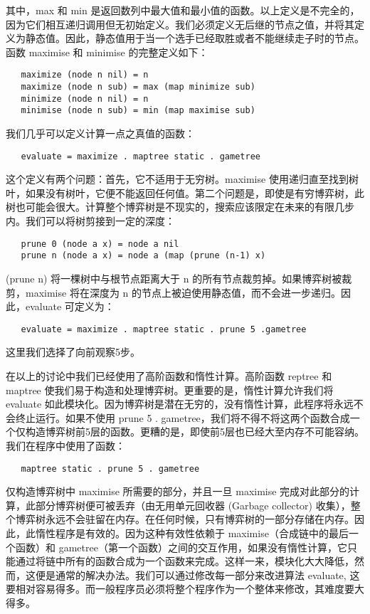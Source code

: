 \documentclass[12pt,a4paper]{article}
\begin{document}
其中，max 和 min 是返回数列中最大值和最小值的函数。以上定义是不完全的，因为它们相互递归调用但无初始定义。我们必须定义无后继的节点之值，并将其定义为静态值。因此，静态值用于当一个选手已经取胜或者不能继续走子时的节点。函数 maximise 和 minimise 的完整定义如下：

\begin{verbatim}
   maximize (node n nil) = n
   maximize (node n sub) = max (map minimize sub)
   minimize (node n nil) = n
   minimise (node n sub) = min (map maximise sub)
\end{verbatim}

我们几乎可以定义计算一点之真值的函数：

\begin{verbatim}
   evaluate = maximize . maptree static . gametree
\end{verbatim}

这个定义有两个问题：首先，它不适用于无穷树。maximise 使用递归直至找到树叶，如果没有树叶，它便不能返回任何值。第二个问题是，即使是有穷博弈树，此树也可能会很大。计算整个博弈树是不现实的，搜索应该限定在未来的有限几步内。我们可以将树剪接到一定的深度：

\begin{verbatim}
   prune 0 (node a x) = node a nil
   prune n (node a x) = node a (map (prune (n-1) x)
\end{verbatim}

(prune n) 将一棵树中与根节点距离大于 n 的所有节点裁剪掉。如果博弈树被裁剪，maximise 将在深度为 n 的节点上被迫使用静态值，而不会进一步递归。因此，evaluate 可定义为：

\begin{verbatim}
   evaluate = maximize . maptree static . prune 5 .gametree
\end{verbatim}

这里我们选择了向前观察5步。

在以上的讨论中我们已经使用了高阶函数和惰性计算。高阶函数 reptree 和 maptree 使我们易于构造和处理博弈树。更重要的是，惰性计算允许我们将 evaluate 如此模块化。因为博弈树是潜在无穷的，没有惰性计算，此程序将永远不会终止运行。如果不使用 prune 5 . gametree，我们将不得不将这两个函数合成一个仅构造博弈树前5层的函数。更糟的是，即使前5层也已经大至内存不可能容纳。我们在程序中使用了函数：

\begin{verbatim}
   maptree static . prune 5 . gametree
\end{verbatim}

仅构造博弈树中 maximise 所需要的部分，并且一旦 maximise 完成对此部分的计算，此部分博弈树便可被丢弃（由无用单元回收器 (Garbage collector) 收集），整个博弈树永远不会驻留在内存。在任何时候，只有博弈树的一部分存储在内存。因此，此惰性程序是有效的。因为这种有效性依赖于 maximise（合成链中的最后一个函数）和 gametree（第一个函数）之间的交互作用，如果没有惰性计算，它只能通过将链中所有的函数合成为一个函数来完成。这样一来，模块化大大降低，然而，这便是通常的解决办法。我们可以通过修改每一部分来改进算法 evaluate, 这要相对容易得多。而一般程序员必须将整个程序作为一个整体来修改，其难度要大得多。
\end{document}
